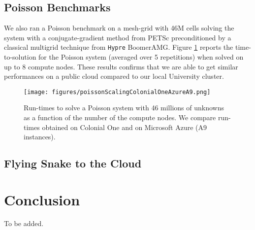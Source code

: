 \documentclass[12pt]{article}
\newcommand{\hypre}{\texttt{Hypre} }
\begin{document}
\subsection{Poisson Benchmarks}

We also ran a Poisson benchmark on a mesh-grid with 46M cells solving the system with a conjugate-gradient method from PETSc preconditioned by a classical multigrid technique from \hypre BoomerAMG.
Figure \ref{poisson_colonialone_azurea9} reports the time-to-solution for the Poisson system (averaged over 5 repetitions) when solved on up to 8 compute nodes.
These results confirms that we are able to get similar performances on a public cloud compared to our local University cluster.

\begin{figure}[h!]
\centering
\texttt{[image: figures/poissonScalingColonialOneAzureA9.png]}
\caption{Run-times to solve a Poisson system with 46 millions of unknowns as a function of the number of the compute nodes. We compare run-times obtained on Colonial One and on Microsoft Azure (A9 instances).}
\label{poisson_colonialone_azurea9}
\end{figure}

\subsection{Flying Snake to the Cloud}


\section{Conclusion}

To be added.


\end{document}
